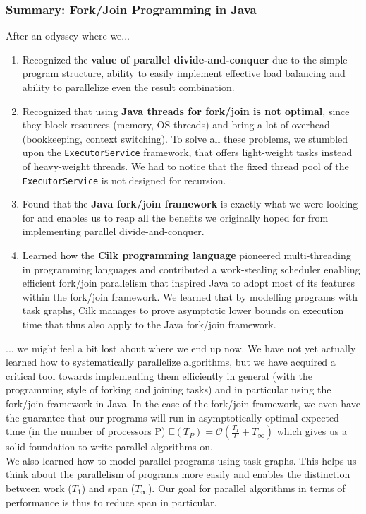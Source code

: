 \documentclass[main.tex]{subfiles}
\begin{document}
\subsubsection{Summary: Fork/Join Programming in Java}
After an odyssey where we...
\begin{enumerate}
  \item Recognized the \textbf{value of parallel divide-and-conquer} due to the simple program structure, ability to easily implement effective load balancing and ability to parallelize even the result combination.
  \item Recognized that using \textbf{Java threads for fork/join is not optimal}, since they block resources (memory, OS threads) and bring a lot of overhead (bookkeeping, context switching). To solve all these problems, we stumbled upon the \texttt{ExecutorService} framework, that offers light-weight tasks instead of heavy-weight threads. We had to notice that the fixed thread pool of the \texttt{ExecutorService} is not designed for recursion.
  \item Found that the \textbf{Java fork/join framework} is exactly what we were looking for and enables us to reap all the benefits we originally hoped for from implementing parallel divide-and-conquer.
  \item Learned how the \textbf{Cilk programming language} pioneered multi-threading in programming languages and contributed a work-stealing scheduler enabling efficient fork/join parallelism that inspired Java to adopt most of its features within the fork/join framework. We learned that by modelling programs with task graphs, Cilk manages to prove asymptotic lower bounds on execution time that thus also apply to the Java fork/join framework.
\end{enumerate}
... we might feel a bit lost about where we end up now. We have not yet actually learned how to systematically parallelize algorithms, but we have acquired a critical tool towards implementing them efficiently in general (with the programming style of forking and joining tasks) and in particular using the fork/join framework in Java. In the case of the fork/join framework, we even have the guarantee that our programs will run in asymptotically optimal expected time (in the number of processors P) \(\mathbb{E}(T_{P})=\mathcal{O}\left(\frac{T_{1}}{P} + T_{\infty}\right)\) which gives us a solid foundation to write parallel algorithms on.\\
We also learned how to model parallel programs using task graphs. This helps us think about the parallelism of programs more easily and enables the distinction between work (\(T_{1}\)) and span (\(T_{\infty}\)). Our goal for parallel algorithms in terms of performance is thus to reduce span in particular.
\end{document}
